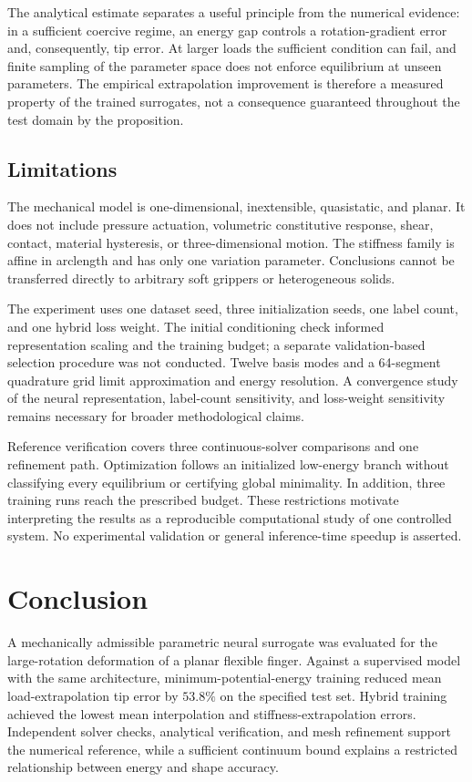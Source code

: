 \documentclass[11pt,a4paper]{article}
\begin{document}
The analytical estimate separates a useful principle from the numerical evidence: in a sufficient coercive regime, an energy gap controls a rotation-gradient error and, consequently, tip error. At larger loads the sufficient condition can fail, and finite sampling of the parameter space does not enforce equilibrium at unseen parameters. The empirical extrapolation improvement is therefore a measured property of the trained surrogates, not a consequence guaranteed throughout the test domain by the proposition.

\subsection{Limitations}
The mechanical model is one-dimensional, inextensible, quasistatic, and planar. It does not include pressure actuation, volumetric constitutive response, shear, contact, material hysteresis, or three-dimensional motion. The stiffness family is affine in arclength and has only one variation parameter. Conclusions cannot be transferred directly to arbitrary soft grippers or heterogeneous solids.

The experiment uses one dataset seed, three initialization seeds, one label count, and one hybrid loss weight. The initial conditioning check informed representation scaling and the training budget; a separate validation-based selection procedure was not conducted. Twelve basis modes and a 64-segment quadrature grid limit approximation and energy resolution. A convergence study of the neural representation, label-count sensitivity, and loss-weight sensitivity remains necessary for broader methodological claims.

Reference verification covers three continuous-solver comparisons and one refinement path. Optimization follows an initialized low-energy branch without classifying every equilibrium or certifying global minimality. In addition, three training runs reach the prescribed budget. These restrictions motivate interpreting the results as a reproducible computational study of one controlled system. No experimental validation or general inference-time speedup is asserted.

\section{Conclusion}
A mechanically admissible parametric neural surrogate was evaluated for the large-rotation deformation of a planar flexible finger. Against a supervised model with the same architecture, minimum-potential-energy training reduced mean load-extrapolation tip error by $53.8\%$ on the specified test set. Hybrid training achieved the lowest mean interpolation and stiffness-extrapolation errors. Independent solver checks, analytical verification, and mesh refinement support the numerical reference, while a sufficient continuum bound explains a restricted relationship between energy and shape accuracy.
\end{document}
